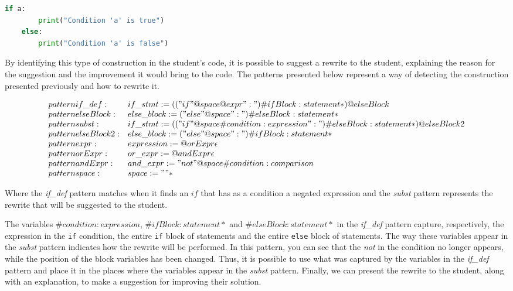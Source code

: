 \begin{lstlisting}[language=Python]
    if a:
        print("Condition 'a' is true")
    else:
        print("Condition 'a' is false")
\end{lstlisting}

By identifying this type of construction in the student's code, it is possible 
to suggest a rewrite to the student, explaining the reason for the suggestion 
and the improvement it would bring to the code. The patterns presented below 
represent a way of detecting the construction presented previously and how to 
rewrite it.

\[
    \begin{array}{ll}
        pattern if\_def : & if\_stmt := (("if" @space @expr ":") \#ifBlock:statement*) @elseBlock \\
        pattern elseBlock : & else\_block := ("else" @space ":") \#elseBlock:statement* \\
    
        pattern subst : & if\_stmt := (("if" @space \#condition:expression ":") \#elseBlock:statement*) @elseBlock2 \\
        pattern elseBlock2 : & else\_block := ("else" @space ":") \#ifBlock:statement* \\
    
        pattern expr    : & expression := @orExpr \epsilon \\
        pattern orExpr  : & or\_expr    := @andExpr \epsilon \\
        pattern andExpr : & and\_expr   := "not" @space \#condition:comparison \\
    
        pattern space : & space := " "*
    \end{array}
\]

Where the \textit{if\_def} pattern matches when it finds an \(if\) that has as 
a condition a negated expression and the \textit{subst} pattern represents the 
rewrite that will be suggested to the student.

The variables \(\#condition:expression\), \(\#ifBlock:statement*\) and \(\#elseBlock:statement*\)
in the \textit{if\_def} pattern capture, respectively, the expression in the
\texttt{if} condition, the entire \texttt{if} block of statements and the entire 
\texttt{else} block of statements.
The way these variables appear in the \textit{subst} pattern indicates how the 
rewrite will be performed. In this pattern, you can see that the \textit{not} 
in the condition no longer appears, while the position of the block variables 
has been changed. Thus, it is possible to use what was captured by the variables 
in the \textit{if\_def} pattern and place it in the places where the variables 
appear in the \textit{subst} pattern. 
Finally, we can present the rewrite to the student, along with an explanation, to 
make a suggestion for improving their solution.

